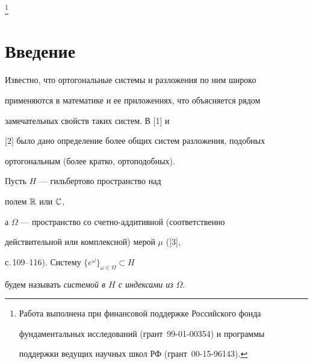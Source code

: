 \thanks{Работа выполнена при финансовой поддержке Российского фонда


фундаментальных исследований (грант \No\,99-01-00354) и программы


поддержки ведущих научных школ РФ (грант \No\,00-15-96143).}





\date{}




\pagestyle{plain} %







\maketitle


\label{begin}








\section{Введение}





Известно, что ортогональные системы и разложения по ним широко


применяются в математике и ее приложениях, что объясняется рядом


замечательных свойств таких систем. В [1] и


[2] было дано определение более общих систем разложения, подобных


ортогональным (более кратко, ортоподобных).





\begin{defn}\hspace{-1.8mm}{\bf.}


Пусть $H$ --- гильбертово пространство над


полем $\Bbb R$ или $\Bbb C$,


а $\Omega$ --- пространство со счетно-аддитивной (соответственно


действительной или комплексной) мерой $\mu$ ([3],


с.\,109--116). Систему $\{e^\omega\}_{\omega\in\Omega}\subset H$


будем называть {\it системой в $H$ с индексами из $\Omega$}.


\end{defn}





